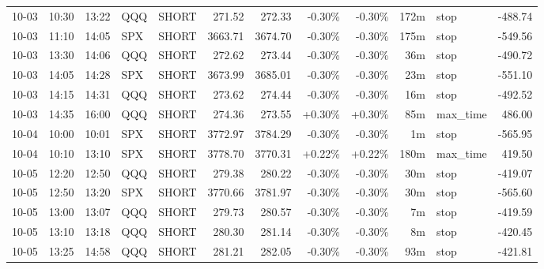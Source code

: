 \documentclass[11pt,a4paper]{article}
\begin{document}
\begin{center}
\begin{longtable}{>{\color{txtmain}}l l l l l r r r r r >{\color{txtmain}}l r}
10-03 & 10:30 & 13:22 & QQQ & SHORT & 271.52 & 272.33 & \textcolor{lossred}{-0.30\%} & \textcolor{lossred}{-0.30\%} & 172m & stop & \textcolor{lossred}{-488.74} \\
10-03 & 11:10 & 14:05 & SPX & SHORT & 3663.71 & 3674.70 & \textcolor{lossred}{-0.30\%} & \textcolor{lossred}{-0.30\%} & 175m & stop & \textcolor{lossred}{-549.56} \\
10-03 & 13:30 & 14:06 & QQQ & SHORT & 272.62 & 273.44 & \textcolor{lossred}{-0.30\%} & \textcolor{lossred}{-0.30\%} & 36m & stop & \textcolor{lossred}{-490.72} \\
10-03 & 14:05 & 14:28 & SPX & SHORT & 3673.99 & 3685.01 & \textcolor{lossred}{-0.30\%} & \textcolor{lossred}{-0.30\%} & 23m & stop & \textcolor{lossred}{-551.10} \\
10-03 & 14:15 & 14:31 & QQQ & SHORT & 273.62 & 274.44 & \textcolor{lossred}{-0.30\%} & \textcolor{lossred}{-0.30\%} & 16m & stop & \textcolor{lossred}{-492.52} \\
10-03 & 14:35 & 16:00 & QQQ & SHORT & 274.36 & 273.55 & \textcolor{wingreen}{+0.30\%} & \textcolor{wingreen}{+0.30\%} & 85m & max\_time & \textcolor{wingreen}{486.00} \\
10-04 & 10:00 & 10:01 & SPX & SHORT & 3772.97 & 3784.29 & \textcolor{lossred}{-0.30\%} & \textcolor{lossred}{-0.30\%} & 1m & stop & \textcolor{lossred}{-565.95} \\
10-04 & 10:10 & 13:10 & SPX & SHORT & 3778.70 & 3770.31 & \textcolor{wingreen}{+0.22\%} & \textcolor{wingreen}{+0.22\%} & 180m & max\_time & \textcolor{wingreen}{419.50} \\
10-05 & 12:20 & 12:50 & QQQ & SHORT & 279.38 & 280.22 & \textcolor{lossred}{-0.30\%} & \textcolor{lossred}{-0.30\%} & 30m & stop & \textcolor{lossred}{-419.07} \\
10-05 & 12:50 & 13:20 & SPX & SHORT & 3770.66 & 3781.97 & \textcolor{lossred}{-0.30\%} & \textcolor{lossred}{-0.30\%} & 30m & stop & \textcolor{lossred}{-565.60} \\
10-05 & 13:00 & 13:07 & QQQ & SHORT & 279.73 & 280.57 & \textcolor{lossred}{-0.30\%} & \textcolor{lossred}{-0.30\%} & 7m & stop & \textcolor{lossred}{-419.59} \\
10-05 & 13:10 & 13:18 & QQQ & SHORT & 280.30 & 281.14 & \textcolor{lossred}{-0.30\%} & \textcolor{lossred}{-0.30\%} & 8m & stop & \textcolor{lossred}{-420.45} \\
10-05 & 13:25 & 14:58 & QQQ & SHORT & 281.21 & 282.05 & \textcolor{lossred}{-0.30\%} & \textcolor{lossred}{-0.30\%} & 93m & stop & \textcolor{lossred}{-421.81} \\

\end{longtable}
\end{center}
\end{document}
